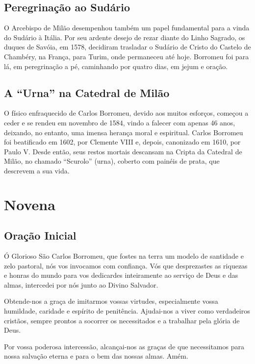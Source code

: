 \documentclass[a4paper,14pt]{extarticle} \usepackage[utf8]{inputenc}
\begin{document}
\subsection{Peregrinação ao Sudário}
O Arcebispo de Milão desempenhou também um papel fundamental para a vinda do Sudário à Itália. Por seu ardente desejo de rezar diante do Linho Sagrado, os duques de Savóia, em 1578, decidiram trasladar o Sudário de Cristo do Castelo de Chambéry, na França, para Turim, onde permaneceu até hoje. Borromeu foi para lá, em peregrinação a pé, caminhando por quatro dias, em jejum e oração.
\subsection{A ``Urna'' na Catedral de Milão}
O físico enfraquecido de Carlos Borromeu, devido aos muitos esforços, começou a ceder e se rendeu em novembro de 1584, vindo a falecer com apenas 46 anos, deixando, no entanto, uma imensa herança moral e espiritual.
Carlos Borromeu foi beatificado em 1602, por Clemente VIII e, depois, canonizado em 1610, por Paulo V. Desde então, seus restos mortais descansam na Cripta da Catedral de Milão, no chamado ``Scurolo'' (urna), coberto com painéis de prata, que descrevem a sua vida.

\newpage

\section{Novena}

\subsection{Oração Inicial} \label{oracao-inicial}

Ó Glorioso São Carlos Borromeu, que fostes na terra um modelo de santidade e zelo pastoral, nós vos invocamos com confiança. Vós que desprezastes as riquezas e honras do mundo para vos dedicardes inteiramente ao serviço de Deus e das almas, intercedei por nós junto ao Divino Salvador.

Obtende-nos a graça de imitarmos vossas virtudes, especialmente vossa humildade, caridade e espírito de penitência. Ajudai-nos a viver como verdadeiros cristãos, sempre prontos a socorrer os necessitados e a trabalhar pela glória de Deus.

Por vossa poderosa intercessão, alcançai-nos as graças de que necessitamos para nossa salvação eterna e para o bem das nossas almas. Amém.
\end{document}
